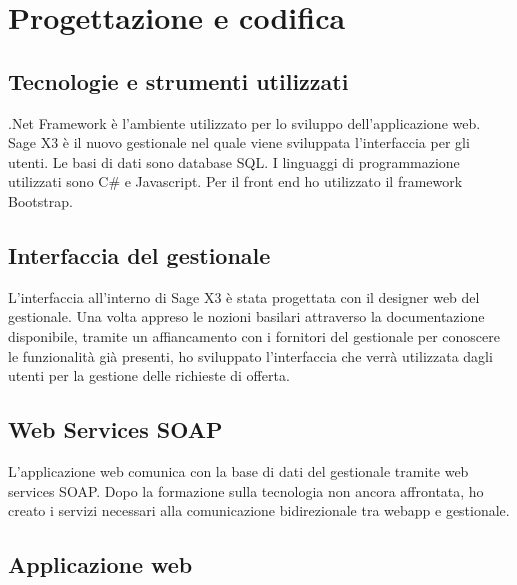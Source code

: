 

\section{Progettazione e codifica}

\subsection{Tecnologie e strumenti utilizzati}

.Net Framework è l’ambiente utilizzato per lo sviluppo dell’applicazione web. Sage X3 è il nuovo gestionale nel quale viene sviluppata l’interfaccia per gli utenti. Le basi di dati sono database SQL. I linguaggi di programmazione utilizzati sono C\# e Javascript. Per il front end ho utilizzato il framework Bootstrap.




\subsection{Interfaccia del gestionale}

L’interfaccia all’interno di Sage X3 è stata progettata con il designer web del gestionale.
Una volta appreso le nozioni basilari attraverso la documentazione disponibile, tramite un affiancamento con i fornitori del gestionale per conoscere le funzionalità già
presenti, ho sviluppato l’interfaccia che verrà utilizzata dagli utenti per la gestione delle richieste di offerta.



\subsection{Web Services SOAP}

L’applicazione web comunica con la base di dati del gestionale tramite web services SOAP. Dopo la formazione sulla tecnologia non ancora affrontata, ho creato i servizi
necessari alla comunicazione bidirezionale tra webapp e gestionale.



\subsection{Applicazione web}

